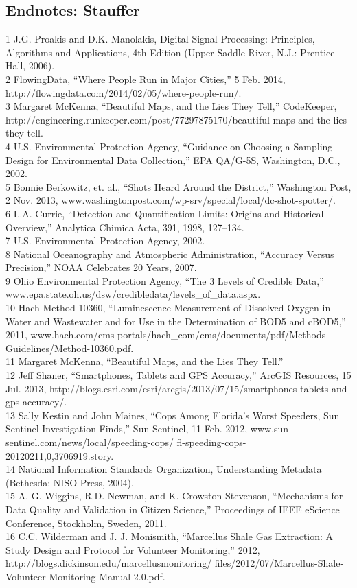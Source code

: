 \begin{itemize}
\section{Endnotes: Stauffer}
1 J.G. Proakis and D.K. Manolakis, Digital Signal Processing: Principles, Algorithms and Applications,
4th Edition (Upper Saddle River, N.J.: Prentice Hall, 2006).\\
2 FlowingData, ``Where People Run in Major Cities,'' 5 Feb. 2014,
http://flowingdata.com/2014/02/05/where-people-run/.\\
3 Margaret McKenna, ``Beautiful Maps, and the Lies They Tell,'' CodeKeeper,
http://engineering.runkeeper.com/post/77297875170/beautiful-maps-and-the-lies-they-tell.\\
4 U.S. Environmental Protection Agency, ``Guidance on Choosing a Sampling Design for
Environmental Data Collection,'' EPA QA/G-5S, Washington, D.C., 2002.\\
5 Bonnie Berkowitz, et. al., ``Shots Heard Around the District,'' Washington Post, 2 Nov. 2013,
www.washingtonpost.com/wp-srv/special/local/dc-shot-spotter/.\\
6 L.A. Currie, ``Detection and Quantification Limits: Origins and Historical Overview,''
Analytica Chimica Acta, 391, 1998, 127–134.\\
7 U.S. Environmental Protection Agency, 2002.\\
8 National Oceanography and Atmospheric Administration, ``Accuracy Versus Precision,''
NOAA Celebrates 20 Years, 2007.\\
9 Ohio Environmental Protection Agency, ``The 3 Levels of Credible Data,''
www.epa.state.oh.us/dsw/credibledata/levels_of_data.aspx.\\
10 Hach Method 10360, ``Luminescence Measurement of Dissolved Oxygen in Water and Wastewater
and for Use in the Determination of BOD5 and cBOD5,'' 2011, www.hach.com/cms-portals/hach_com/cms/documents/pdf/Methods-Guidelines/Method-10360.pdf.\\
11 Margaret McKenna, ``Beautiful Maps, and the Lies They Tell.''\\
12 Jeff Shaner, ``Smartphones, Tablets and GPS Accuracy,'' ArcGIS Resources, 15 Jul. 2013,
http://blogs.esri.com/esri/arcgis/2013/07/15/smartphones-tablets-and-gps-accuracy/.\\
13 Sally Kestin and John Maines, ``Cops Among Florida's Worst Speeders, Sun Sentinel Investigation
Finds,'' Sun Sentinel, 11 Feb. 2012, www.sun-sentinel.com/news/local/speeding-cops/
fl-speeding-cops-20120211,0,3706919.story.\\
14 National Information Standards Organization, Understanding Metadata
(Bethesda: NISO Press, 2004).\\
15 A. G. Wiggins, R.D. Newman, and K. Crowston Stevenson, ``Mechanisms for Data Quality and
Validation in Citizen Science,'' Proceedings of IEEE eScience Conference, Stockholm, Sweden, 2011.\\
16 C.C. Wilderman and J. J. Monismith, ``Marcellus Shale Gas Extraction: A Study Design and
Protocol for Volunteer Monitoring,'' 2012, http://blogs.dickinson.edu/marcellusmonitoring/
files/2012/07/Marcellus-Shale-Volunteer-Monitoring-Manual-2.0.pdf.\\


\end{itemize}
